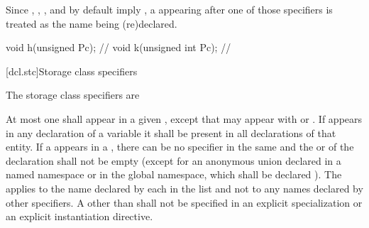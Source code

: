 \pnum
{}%
%
%
%
\begin{note}
Since , , , and 
by default imply , a  appearing after one
of those specifiers is treated as the name being (re)declared.
\begin{example}
\begin{codeblock}
void h(unsigned Pc);            // 
void k(unsigned int Pc);        // 
\end{codeblock}
\end{example}
\end{note}

[dcl.stc]{Storage class specifiers}%
%
%
%
%
%

\pnum
The storage class specifiers are

\begin{bnf}
\br
    \br
    \br
    \br
\end{bnf}

At most one  shall appear in a given
, except that  may appear with  or
. If  appears in any declaration of
a variable it shall be present in all declarations of that entity. If a
appears in a , there can be no
 specifier in the same  and
the  or 
of the declaration shall not be
empty (except for an anonymous union declared in a named namespace or in the
global namespace, which shall be declared
%
). The
 applies to the name declared by each
 in the list and not to any names declared by
other specifiers. A 
other than 
shall not be
specified in an explicit specialization or an
explicit instantiation directive.

